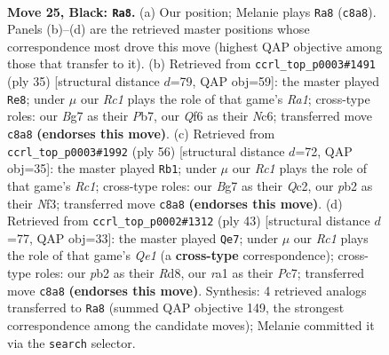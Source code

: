 \documentclass[11pt]{article}
\begin{document}
\clearpage

\begin{figure}[p]\centering
\begin{subfigure}{0.46\textwidth}\centering
\resizebox{\linewidth}{!}{%
\newchessgame
\chessboard[
  setfen={2r3k1/pp3pb1/1nn2qp1/3p4/3P3p/1B5P/PP3PPB/RN2Q1K1 b - - 1 25},
  showmover=false,
  pgfstyle=straightmove, color=movearrow, markmove={c8-a8}
]}
\caption{}
\end{subfigure}\hfill
\begin{subfigure}{0.46\textwidth}\centering
\resizebox{\linewidth}{!}{%
\newchessgame
\chessboard[
  setfen={r5k1/1p1q1pp1/p1n2nbp/3p4/N2P1BP1/5P2/PP4BP/2RQ2K1 b - - 2 18},
  showmover=false,
  pgfstyle=straightmove, color=movearrow, markmove={a8-e8}
]}
\caption{}
\end{subfigure}
\\[4pt]
\begin{subfigure}{0.46\textwidth}\centering
\resizebox{\linewidth}{!}{%
\newchessgame
\chessboard[
  setfen={4bnk1/r5p1/1q1bp2p/1p6/2p1B3/2N1PN1P/1PQ2PP1/2R3K1 w - - 0 29},
  showmover=false,
  pgfstyle=straightmove, color=movearrow, markmove={c1-b1}
]}
\caption{}
\end{subfigure}\hfill
\begin{subfigure}{0.46\textwidth}\centering
\resizebox{\linewidth}{!}{%
\newchessgame
\chessboard[
  setfen={3rq1k1/ppp2p2/4n2p/3pPnp1/P4P2/2P4P/1P4P1/R1BQ1NK1 b - - 0 22},
  showmover=false,
  pgfstyle=straightmove, color=movearrow, markmove={e8-e7}
]}
\caption{}
\end{subfigure}
\caption{\textbf{Move 25, Black: \texttt{Ra8}.} (a) Our position; Melanie plays \texttt{Ra8} (\texttt{c8a8}). Panels (b)--(d) are the retrieved master positions whose correspondence most drove this move (highest QAP objective among those that transfer to it). (b) Retrieved from \texttt{ccrl\_top\_p0003\#1491} (ply 35) [structural distance $d$=79, QAP obj=59]: the master played \texttt{Re8}; under $\mu$ our \emph{Rc1} plays the role of that game's \emph{Ra1}; cross-type roles: our \emph{B}g7 as their \emph{P}b7, our \emph{Q}f6 as their \emph{N}c6; transferred move \texttt{c8a8} \textbf{(endorses this move)}. (c) Retrieved from \texttt{ccrl\_top\_p0003\#1992} (ply 56) [structural distance $d$=72, QAP obj=35]: the master played \texttt{Rb1}; under $\mu$ our \emph{Rc1} plays the role of that game's \emph{Rc1}; cross-type roles: our \emph{B}g7 as their \emph{Q}c2, our \emph{p}b2 as their \emph{N}f3; transferred move \texttt{c8a8} \textbf{(endorses this move)}. (d) Retrieved from \texttt{ccrl\_top\_p0002\#1312} (ply 43) [structural distance $d$=77, QAP obj=33]: the master played \texttt{Qe7}; under $\mu$ our \emph{Rc1} plays the role of that game's \emph{Qe1} (a \textbf{cross-type} correspondence); cross-type roles: our \emph{p}b2 as their \emph{R}d8, our \emph{r}a1 as their \emph{P}c7; transferred move \texttt{c8a8} \textbf{(endorses this move)}. Synthesis: 4 retrieved analogs transferred to \texttt{Ra8} (summed QAP objective 149, the strongest correspondence among the candidate moves); Melanie committed it via the \texttt{search} selector.}
\label{fig:thought-m49}
\end{figure}
\end{document}

